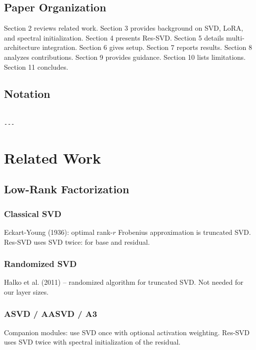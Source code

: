 \subsection{Paper Organization}

Section 2 reviews related work. Section 3 provides background on SVD, LoRA, 
and spectral initialization. Section 4 presents Res-SVD. Section 5 details 
multi-architecture integration. Section 6 gives setup. Section 7 reports 
results. Section 8 analyzes contributions. Section 9 provides guidance. 
Section 10 lists limitations. Section 11 concludes.



\subsection{Notation}

\begin{lstlisting}

---
\end{lstlisting}

\section{Related Work}

\subsection{Low-Rank Factorization}

\subsubsection{Classical SVD}

Eckart-Young (1936): optimal rank-$r$ Frobenius approximation is truncated SVD. 
Res-SVD uses SVD twice: for base and residual.

\subsubsection{Randomized SVD}

Halko et al. (2011) -- randomized algorithm for truncated SVD. Not needed 
for our layer sizes.

\subsubsection{ASVD / AASVD / A3}

Companion modules: use SVD once with optional activation weighting. Res-SVD 
uses SVD twice with spectral initialization of the residual.

